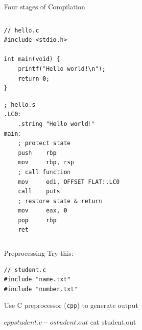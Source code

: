\documentclass{../TexTemplate/myslide}
\begin{document}
\begin{frame}[fragile]{Four stages of Compilation}
\begin{columns}
\begin{column}{0.5\linewidth}
\tiny
\begin{verbatim}
// hello.c
#include <stdio.h>

int main(void) {
    printf("Hello world!\n");
    return 0;
}
\end{verbatim}
\tiny
\begin{verbatim}
; hello.s
.LC0:
    .string "Hello world!"
main:
    ; protect state
    push    rbp
    mov     rbp, rsp
    ; call function
    mov     edi, OFFSET FLAT:.LC0
    call    puts
    ; restore state & return
    mov     eax, 0
    pop     rbp    
    ret
\end{verbatim}
\end{column}
\begin{column}{0.5\linewidth}
\begin{center}
\end{center}
\end{column}
\end{columns}
\end{frame}

\begin{frame}[fragile]{Preprocessing}
Try this:
\begin{lstlisting}
// student.c
#include "name.txt"
#include "number.txt"
\end{lstlisting}
Use C preprocessor (\verb'cpp') to generate output
\begin{bashcode}
$ cpp student.c -o student.out
$ cat student.out
\end{bashcode}
\end{frame}
\end{document}

